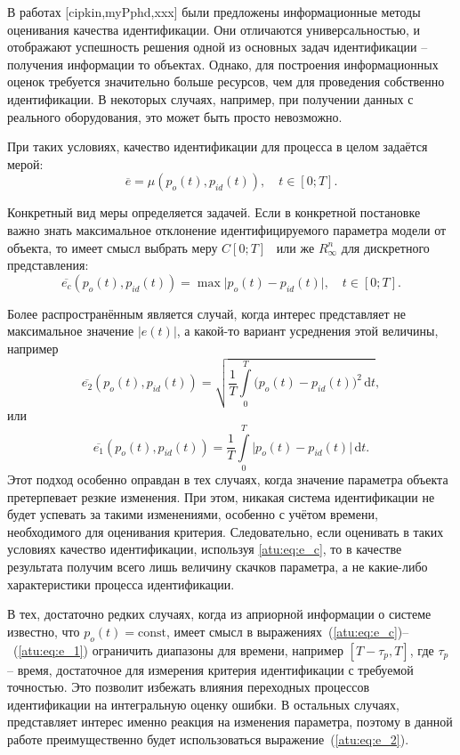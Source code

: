 В работах [cipkin,myPphd,xxx] были предложены информационные методы
оценивания качества идентификации.
Они отличаются универсальностью, и отображают
успешность решения одной из основных задач
идентификации -- получения информации то объектах.
Однако, для построения информационных оценок
требуется значительно больше ресурсов, чем
для проведения собственно идентификации. В некоторых случаях,
например, при получении данных с реального оборудования,
это может быть просто невозможно.



При таких условиях, качество идентификации для процесса
в целом задаётся мерой:
%
\[
  \overline{e} = \mu( p_o(t), p_{id}(t) ),
  \quad
  t \in [0;T].
\]

Конкретный вид меры определяется задачей.
Если в конкретной постановке важно знать максимальное
отклонение идентифицируемого параметра модели от объекта,
то имеет смысл выбрать меру $C[0;T]$~\cite{kolmogorov_fun_ana} или же
$R_{\infty}^n$ для дискретного представления:
%
\begin{equation}
  \overline{e_c}(p_o(t),p_{id}(t))
  =
  \max \big| p_o(t)-p_{id}(t) \big|,
  \quad
  t \in [0;T].
  \label{atu:eq:e_c}
\end{equation}

Более распространённым является случай,
когда интерес представляет не максимальное значение $|e(t)|$,
а какой-то вариант усреднения этой величины, например
%
\begin{equation}
  \overline{e_2}(p_o(t),p_{id}(t))
  =
  \sqrt{ \frac{1}{T} \int\limits_{0}^{T} \big( p_o(t)-p_{id}(t) \big)^2 \, \mathrm{d}t },
  \label{atu:eq:e_2}
\end{equation}
%
или
\begin{equation}
  \overline{e_1}(p_o(t),p_{id}(t))
  =
  \frac{1}{T} \int\limits_{0}^{T} \big| p_o(t)-p_{id}(t) \big| \, \mathrm{d}t .
  \label{atu:eq:e_1}
\end{equation}
%
Этот подход особенно оправдан в тех случаях, когда
значение параметра объекта претерпевает резкие изменения.
При этом, никакая система идентификации не будет успевать за такими
изменениями, особенно с учётом времени, необходимого для
оценивания критерия. Следовательно, если оценивать в таких условиях
качество идентификации, используя \ref{atu:eq:e_c},
то в качестве результата получим всего лишь величину
скачков параметра, а не какие-либо характеристики процесса идентификации.

В тех, достаточно редких случаях, когда из априорной
информации о системе известно, что $p_o(t) = \mathrm{const}$,
имеет смысл в выражениях~(\ref{atu:eq:e_c})--~(\ref{atu:eq:e_1})
ограничить диапазоны для времени, например $[T-\tau_p,T]$,
где $\tau_p$ -- время, достаточное для измерения
критерия идентификации с требуемой точностью.
Это позволит избежать влияния переходных процессов
идентификации на интегральную оценку ошибки.
В остальных случаях, представляет интерес именно реакция
на изменения параметра, поэтому в данной работе преимущественно будет
использоваться выражение~(\ref{atu:eq:e_2}).




